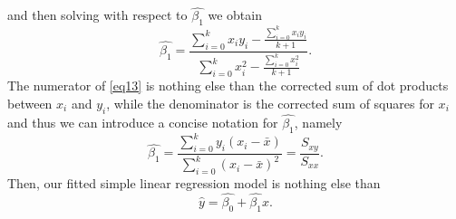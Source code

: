 \documentclass[10pt,a4paper, twocolumn, conference]{IEEEtran}
\begin{document}
and then solving with respect to $\hat{\beta_1}$ we obtain
\begin{equation}
\hat{\beta_1} = \frac{\sum_{i=0}^k x_i y_i - \frac{\sum_{i = 0}^k x_i y_i}{k + 1}}{\sum_{i=0}^k x_i^2 - \frac{\sum_{i=0}^k x_i^2}{k+1}}.
\end{equation}
The numerator of \cref{eq13} is nothing else than the corrected sum of dot products between $x_i$ and $y_i$, while the denominator is the corrected sum of squares for $x_i$ and thus we can introduce a concise notation for $\hat{\beta_1}$, namely
\begin{equation}
\hat{\beta_1} = \frac{\sum_{i=0}^k y_i (x_i - \bar{x})}{\sum_{i=0}^k (x_i - \bar{x})^2} = \frac{S_{xy}}{S_{xx}}.
\end{equation}
Then, our fitted simple linear regression model is nothing else than
\begin{equation}
\hat{y} = \hat{\beta_0} + \hat{\beta_1} x.
\end{equation}
\end{document}
